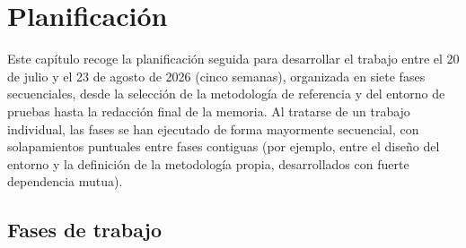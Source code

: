 \chapter{Planificación}
\label{cap:planificacion}

Este capítulo recoge la planificación seguida para desarrollar el trabajo
entre el 20 de julio y el 23 de agosto de 2026 (cinco semanas), organizada
en siete fases secuenciales, desde la selección de la metodología de
referencia y del entorno de pruebas hasta la redacción final de la memoria.
Al tratarse de un trabajo individual, las fases se han ejecutado de forma
mayormente secuencial, con solapamientos puntuales entre fases contiguas
(por ejemplo, entre el diseño del entorno y la definición de la metodología
propia, desarrollados con fuerte dependencia mutua).

\section{Fases de trabajo}

